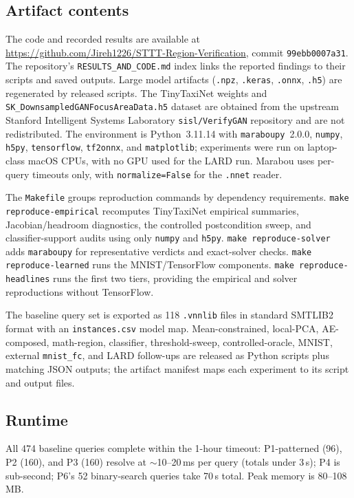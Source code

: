 \documentclass[twocolumn,smallextended,runningheads]{svjour3}
\begin{document}
\subsection{Artifact contents}

The code and recorded results are available at \url{https://github.com/Jireh1226/STTT-Region-Verification}, commit \texttt{99ebb0007a31}. The repository's \texttt{RESULTS\_AND\_CODE.md} index links the reported findings to their scripts and saved outputs. Large model artifacts (\texttt{.npz}, \texttt{.keras}, \texttt{.onnx}, \texttt{.h5}) are regenerated by released scripts. The TinyTaxiNet weights and \texttt{SK\_DownsampledGANFocusAreaData.h5} dataset are obtained from the upstream Stanford Intelligent Systems Laboratory \texttt{sisl/VerifyGAN} repository and are not redistributed. The environment is Python~3.11.14 with \texttt{maraboupy}~2.0.0, \texttt{numpy}, \texttt{h5py}, \texttt{tensorflow}, \texttt{tf2onnx}, and \texttt{matplotlib}; experiments were run on laptop-class macOS CPUs, with no GPU used for the LARD run. Marabou uses per-query timeouts only, with \texttt{normalize=False} for the \texttt{.nnet} reader.

The \texttt{Makefile} groups reproduction commands by dependency requirements. \texttt{make reproduce-empirical} recomputes TinyTaxiNet empirical summaries, Jacobian/headroom diagnostics, the controlled postcondition sweep, and classifier-support audits using only \texttt{numpy} and \texttt{h5py}. \texttt{make reproduce-solver} adds \texttt{maraboupy} for representative verdicts and exact-solver checks. \texttt{make reproduce-learned} runs the MNIST/TensorFlow components. \texttt{make reproduce-headlines} runs the first two tiers, providing the empirical and solver reproductions without TensorFlow.

The baseline query set is exported as 118 \texttt{.vnnlib} files in standard SMTLIB2 format with an \texttt{instances.csv} model map. Mean-constrained, local-PCA, AE-composed, math-region, classifier, threshold-sweep, controlled-oracle, MNIST, external \texttt{mnist\_fc}, and LARD follow-ups are released as Python scripts plus matching JSON outputs; the artifact manifest maps each experiment to its script and output files.

\subsection{Runtime}

All 474 baseline queries complete within the 1-hour timeout: P1-patterned (96), P2 (160), and P3 (160) resolve at $\sim$10--20\,ms per query (totals under 3\,s); P4 is sub-second; P6's 52 binary-search queries take 70\,s total. Peak memory is 80--108\,MB.
\end{document}
